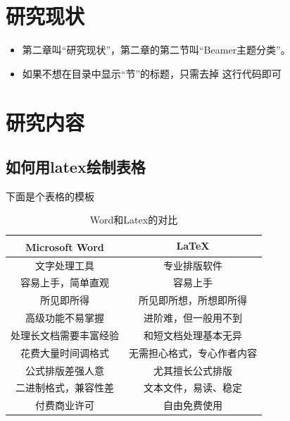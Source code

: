 \documentclass{beamer}
\begin{document}
\section{研究现状}
\begin{frame}
    \begin{itemize}
        \item 第二章叫“研究现状”，第二章的第二节叫“Beamer主题分类”。
        \item 如果不想在目录中显示“节”的标题，只需去掉{} 这行代码即可       
    \end{itemize}
\end{frame}


\section{研究内容}
\subsection{如何用latex绘制表格}

\begin{frame}{下面是个表格的模板}
    \begin{table}[h]
        \centering
        \caption{Word和Latex的对比}
        \begin{tabular}{c|c}
        	            Microsoft\textsuperscript{\textregistered}  Word & \LaTeX \\
            \hline
            文字处理工具 & 专业排版软件 \\
            容易上手，简单直观 & 容易上手 \\
            所见即所得 & 所见即所想，所想即所得 \\
            高级功能不易掌握 & 进阶难，但一般用不到 \\
            处理长文档需要丰富经验 & 和短文档处理基本无异 \\
            花费大量时间调格式 & 无需担心格式，专心作者内容 \\
            公式排版差强人意 & 尤其擅长公式排版 \\
            二进制格式，兼容性差 & 文本文件，易读、稳定 \\
            付费商业许可 & 自由免费使用 \\
        \end{tabular}
    \end{table}
\end{frame}
\end{document}
